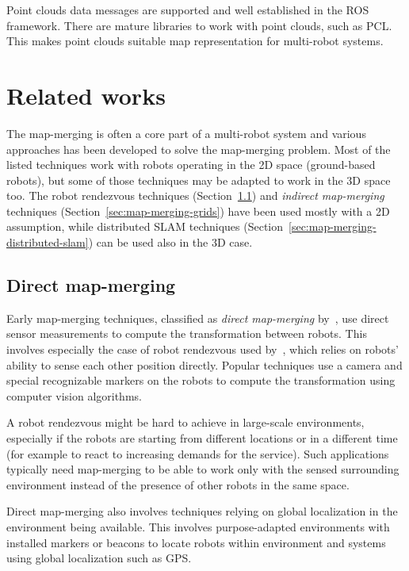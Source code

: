 Point clouds data messages are supported and well established in the \gls{ROS} framework. There are mature libraries to work with point clouds, such as \gls{PCL}. This makes point clouds suitable map representation for multi-robot systems.

\section{Related works}

The map-merging is often a core part of a multi-robot system and various approaches has been developed to solve the map-merging problem. Most of the listed techniques work with robots operating in the \gls{2D} space (ground-based robots), but some of those techniques may be adapted to work in the \gls{3D} space too. The robot rendezvous techniques (Section~\ref{sec:direct-map-merging}) and \textit{indirect map-merging} techniques (Section~\ref{sec:map-merging-grids}) have been used mostly with a \gls{2D} assumption, while distributed \gls{SLAM} techniques (Section~\ref{sec:map-merging-distributed-slam}) can be used also in the \gls{3D} case.

\subsection{Direct map-merging}
\label{sec:direct-map-merging}

Early map-merging techniques, classified as \textit{direct map-merging} by~\citet{lee2012survey}, use direct sensor measurements to compute the transformation between robots. This involves especially the case of robot rendezvous used by~\citet{zhou2006rendezvous}, which relies on robots' ability to sense each other position directly. Popular techniques use a camera and special recognizable markers on the robots to compute the transformation using computer vision algorithms.

A robot rendezvous might be hard to achieve in large-scale environments, especially if the robots are starting from different locations or in a different time (for example to react to increasing demands for the service). Such applications typically need map-merging to be able to work only with the sensed surrounding environment instead of the presence of other robots in the same space.

Direct map-merging also involves techniques relying on global localization in the environment being available. This involves purpose-adapted environments with installed markers or beacons to locate robots within environment and systems using global localization such as \gls{GPS}.


